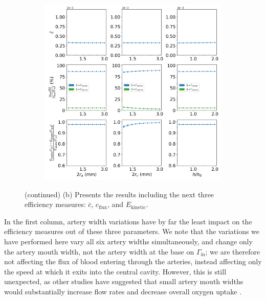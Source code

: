             \begin{figure}\ContinuedFloat
                \centering
                \begin{subfigure}{\textwidth}
                    \includegraphics[width=1\textwidth]{diagrams/results-variations/mega2_artery_width_vein_width_wall_height_ratio.png}
                    \caption{}
                    \label{fig:mega-other1:2}
                \end{subfigure}
                \caption{(continued) (b) Presents the results including the next three efficiency measures: $\bar{c}$, $c_\text{flux}$, and $E_\text{kinetic}$.}
                \label{fig:mega-other1}
            \end{figure}

            In the first column, artery width variations have by far the least impact on the efficiency measures out of these three parameters. We note that the variations we have performed here vary all six artery widths simultaneously, and change only the artery mouth width, not the artery width at the base on $\Gamma_\text{in}$; we are therefore not affecting the flux of blood entering through the arteries, instead affecting only the speed at which it exits into the central cavity. However, this is still unexpected, as other studies have suggested that small artery mouth widths would substantially increase flow rates and decrease overall oxygen uptake \cite{burtonRheologicalPhysiologicalConsequences2009}.

